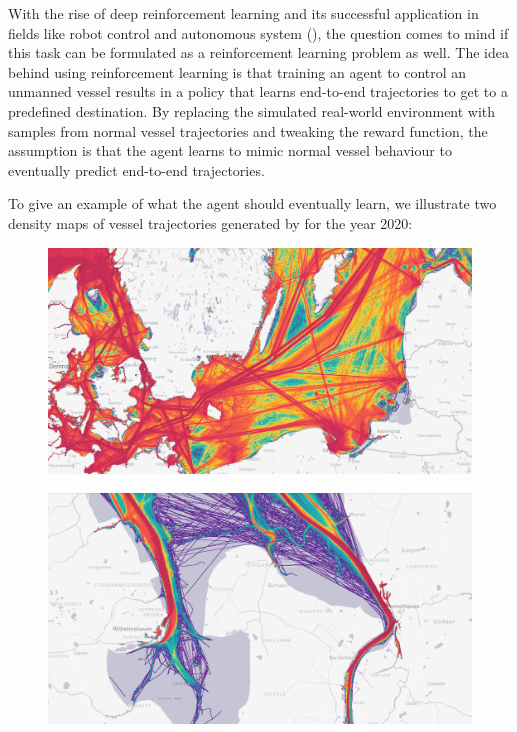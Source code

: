 With the rise of deep reinforcement learning and its successful application in fields like robot control and autonomous system (\cite{s18092905, zare2021continuous, 9195789, martinsen2018curved}), the question comes to mind if this task can be formulated as a reinforcement learning problem as well. The idea behind using reinforcement learning is that training an agent to control an unmanned vessel results in a policy that learns end-to-end trajectories to get to a predefined destination. By replacing the simulated real-world environment with samples from normal vessel trajectories and tweaking the reward function, the assumption is that the agent learns to mimic normal vessel behaviour to eventually predict end-to-end trajectories.
\par
To give an example of what the agent should eventually learn, we illustrate two density maps of vessel trajectories generated by \cite{martinetraffic} for the year 2020:
\begin{figure}[H]
    \centering
    \begin{minipage}{.47\textwidth}
      \centering
      \includegraphics[width=\textwidth]{images/balticsea_density_routes.PNG}
      \label{fig:baltic}
    \end{minipage}
    \hspace{.05\textwidth}%
    \begin{minipage}{.47\textwidth}
        \centering
        \includegraphics[width=\textwidth]{images/bhv_jadebusen_density_routes.PNG}
        \label{fig:jadebusen}
      \end{minipage}
\end{figure}
